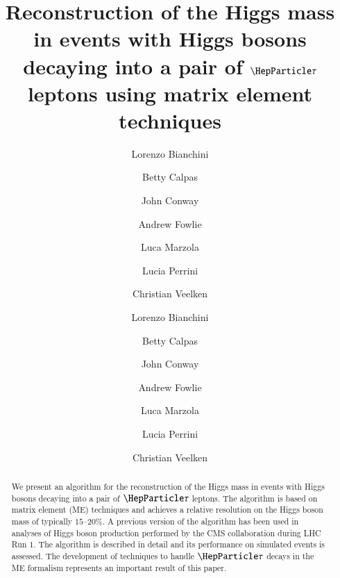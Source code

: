 \documentclass[a4paper,english,11pt]{article}
\begin{document}
\ifx\ver\verPAPER
\begin{frontmatter}
\fi

\title{Reconstruction of the Higgs mass in events with Higgs bosons
  decaying into a pair of $\Pgt$ leptons using matrix element techniques}


\ifx\ver\verPreprint
\author[1]{Lorenzo Bianchini}
\author[2]{Betty Calpas}
\author[3]{John Conway}
\author[4]{Andrew Fowlie}
\author[2, 5]{Luca Marzola}
\author[2]{Lucia Perrini}
\author[6]{Christian Veelken}
\fi
\ifx\ver\verPAPER
\author[eth]{Lorenzo Bianchini}
\author[tallinn]{Betty Calpas}
\author[ucd]{John Conway}
\author[melb]{Andrew Fowlie}
\author[tartu]{Luca Marzola}
\author[tallinn]{Lucia Perrini}
\author[cern]{Christian Veelken}
\address[eth]{Institute for Particle Physics, ETH Zurich, 8093 Zurich, Switzerland}
\address[ucd]{Department of Physics, University of California, Davis, CA 95616}
\address[tallinn]{National Institute for Chemical Physics and Biophysics, 10143 Tallinn, Estonia}
\address[tartu]{Institute of Physics, University of Tartu, 51014 Tartu, Estonia}
\address[melb]{ARC Centre of Excellence for Particle Physics at the Tera-scale, Monash University, Melbourne, Victoria 3800, Australia}
\address[cern]{CERN, 1211 Geneva, Switzerland}
\fi

\ifx\ver\verPreprint
\maketitle
\fi

\begin{abstract}
We present an algorithm for the reconstruction of the Higgs mass in events with Higgs bosons decaying into a pair of $\Pgt$ leptons.
The algorithm is based on matrix element (ME) techniques and achieves
a relative resolution on the Higgs boson mass of typically $15$--$20\%$.
A previous version of the algorithm has been used in analyses of Higgs
boson production performed by the CMS collaboration during LHC Run
$1$.
The algorithm is described in detail and its performance on simulated
events is assessed.
The development of techniques to handle $\Pgt$ decays in the ME
formalism represents an important result of this paper.
\end{abstract}

\ifx\ver\verPAPER
\end{frontmatter}
\fi
\end{document}
